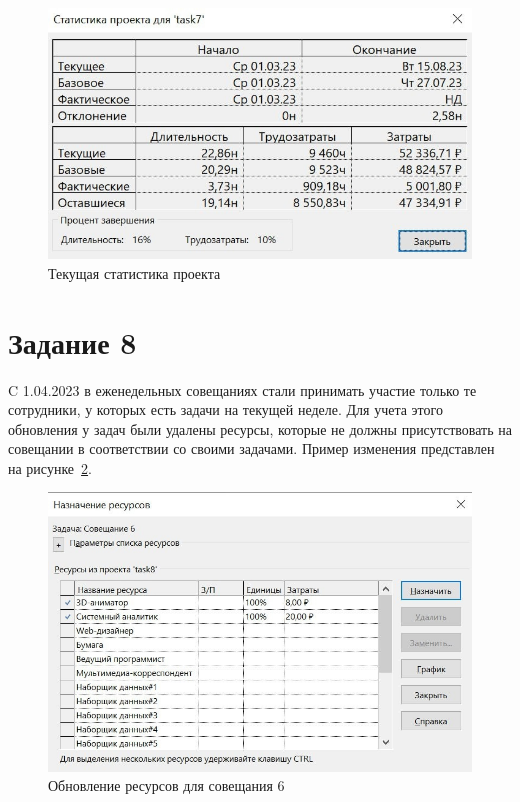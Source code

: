 \begin{figure}[H]
	\begin{center}
		\includegraphics[scale=0.3]{inc/img/task7-stat.jpg}
	\end{center}
	\captionsetup{justification=centering}
	\caption{Текущая статистика проекта}
	\label{img:task7-stat}
\end{figure}

\section*{Задание 8}

C 1.04.2023 в еженедельных совещаниях стали принимать участие только те сотрудники, у которых есть задачи на текущей неделе. Для учета этого обновления у задач были удалены ресурсы, которые не должны присутствовать на совещании в соответствии со своими задачами. Пример изменения представлен на рисунке~\ref{img:task8}.

\begin{figure}[H]
	\begin{center}
		\includegraphics[scale=0.25]{inc/img/task8.jpg}
	\end{center}
	\captionsetup{justification=centering}
	\caption{Обновление ресурсов для совещания 6}
	\label{img:task8}
\end{figure}

